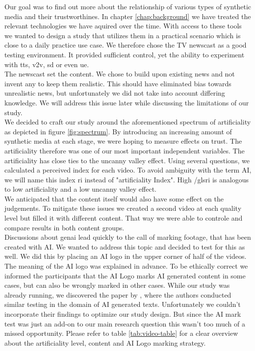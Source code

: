 \documentclass[
  a4paper,  %
  twoside,  %
  bibliography=totoc,
  headsepline,
  cleardoublepage=empty,
  parskip=half,
  draft=false
]{scrbook}
\begin{document}
Our goal was to find out more about the relationship of various types of synthetic media and their trustworthines. In chapter \ref{chap:background} we have treated the relevant technologies we have aquired over the time. With access to these tools we wanted to design a study that utilizes them in a practical scenario which is close to a daily practice use case. We therefore chose the TV newscast as a good testing environment. It provided sufficient control, yet the ability to experiment with \gls{tts}, \gls{v2v}, \gls{sd} or even \gls{ue}. \\
The newscast set the content. We chose to build upon existing news and not invent any to keep them realistic. This should have eliminated bias towards unrealistic news, but unfortunately we did not take into account differing knowledge. We will address this issue later while discussing the limitations of our study. \\
We decided to craft our study around the aforementioned spectrum of artificiality as depicted in figure \ref{fig:spectrum}. By introducing an increasing amount of synthetic media at each stage, we were hoping to measure effects on trust. The artificiality therefore was one of our most important independent variables. The artificiality has close ties to the uncanny valley effect. Using several questions, we calculated a perceived index for each video. To avoid ambiguity with the term AI, we will name this index \gls{ri} instead of "artificiality Index". High /gls{ri} is analogous to low artificiality and a low uncanny valley effect.\\
We anticipated that the content itself would also have some effect on the judgements. To mitigate these issues we created a second video at each quality level but filled it with different content. That way we were able to controle and compare results in both content groups. \\
Discussions about \gls{genai} lead quickly to the call of marking footage, that has been created with AI. We wanted to address this topic and decided to test for this as well. We did this by placing an AI logo in the upper corner of half of the videos. The meaning of the AI logo was explained in advance. To be ethically correct we informed the participants that the AI Logo marks AI generated content in some cases, but can also be wrongly marked in other cases. While our study was already running, we discovered the paper by \citeauthor{toffTheyCouldJust2023}, where the authors conducted similar testing in the domain of AI generated texts. Unfortunately we couldn't incorporate their findings to optimize our study design. But since the AI mark test was just an add-on to our main research question this wasn't too much of a missed opportunity. Please refer to table \ref{tab:video-table} for a clear overview about the artificiality level, content and AI Logo marking strategy.
\end{document}
